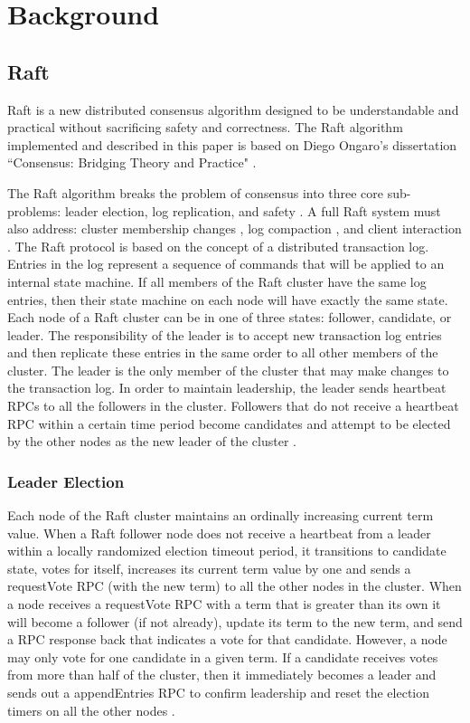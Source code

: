 \documentclass[conference,compsoc]{./IEEEtran/IEEEtran}
\begin{document}
\section{Background}

\subsection{Raft}

Raft is a new distributed consensus algorithm designed to be
understandable and practical without sacrificing safety and
correctness. The Raft algorithm implemented and described in this
paper is based on Diego Ongaro's dissertation ``Consensus: Bridging
Theory and Practice" \cite{raft_thesis:ongaro14}.

The Raft algorithm breaks the problem of consensus into three core
sub-problems: leader election, log replication, and safety
\cite[Section~3]{raft_thesis:ongaro14}. A full Raft system must also
address: cluster membership changes
\cite[Section~4]{raft_thesis:ongaro14}, log compaction
\cite[Section~5]{raft_thesis:ongaro14}, and client
interaction \cite[Section~6]{raft_thesis:ongaro14}. The Raft protocol
is based on the concept of a distributed transaction log. Entries in
the log represent a sequence of commands that will be applied to an
internal state machine. If all members of the Raft cluster have the
same log entries, then their state machine on each node will have
exactly the same state. Each node of a Raft cluster can be in one of
three states: follower, candidate, or leader. The responsibility of
the leader is to accept new transaction log entries and then
replicate these entries in the same order to all other members of the
cluster. The leader is the only member of the cluster that may make
changes to the transaction log. In order to maintain leadership, the
leader sends heartbeat RPCs to all the followers in the cluster.
Followers that do not receive a heartbeat RPC within a certain time
period become candidates and attempt to be elected by the other nodes
as the new leader of the cluster \cite[p.~12]{raft_thesis:ongaro14}.

\subsubsection{Leader Election}

Each node of the Raft cluster maintains an ordinally increasing
current term value. When a Raft follower node does not receive
a heartbeat from a leader within a locally randomized election timeout
period, it transitions to candidate state, votes for itself, increases
its current term value by one and sends a requestVote RPC (with the
new term) to all the other nodes in the cluster. When a node receives
a requestVote RPC with a term that is greater than its own it will
become a follower (if not already), update its term to the new term,
and send a RPC response back that indicates a vote for that candidate.
However, a node may only vote for one candidate in a given term. If
a candidate receives votes from more than half of the cluster, then it
immediately becomes a leader and sends out a appendEntries RPC to
confirm leadership and reset the election timers on all the other
nodes \cite[Section~3.4]{raft_thesis:ongaro14}.
\end{document}
